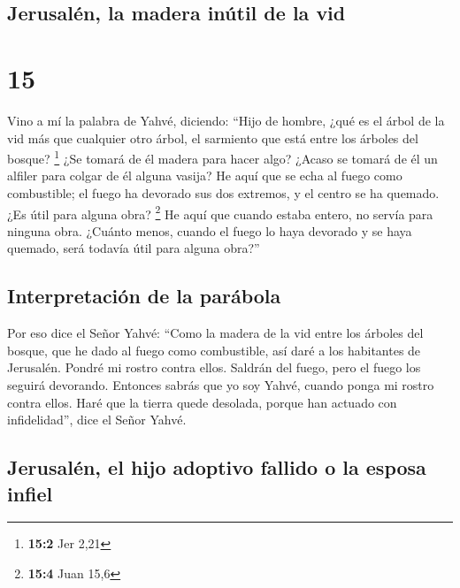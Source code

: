 \hypertarget{jerusaluxe9n-la-madera-inuxfatil-de-la-vid}{%
\subsection{Jerusalén, la madera inútil de la
vid}\label{jerusaluxe9n-la-madera-inuxfatil-de-la-vid}}

\hypertarget{section-14}{%
\section{15}\label{section-14}}

 Vino a mí la palabra de Yahvé, diciendo: 
``Hijo de hombre, ¿qué es el árbol de la vid más que cualquier otro
árbol, el sarmiento que está entre los árboles del bosque? \footnote{\textbf{15:2}
  Jer 2,21}  ¿Se tomará de él madera para hacer algo?
¿Acaso se tomará de él un alfiler para colgar de él alguna vasija?
 He aquí que se echa al fuego como combustible; el fuego
ha devorado sus dos extremos, y el centro se ha quemado. ¿Es útil para
alguna obra? \footnote{\textbf{15:4} Juan 15,6}  He aquí
que cuando estaba entero, no servía para ninguna obra. ¿Cuánto menos,
cuando el fuego lo haya devorado y se haya quemado, será todavía útil
para alguna obra?''

\hypertarget{interpretaciuxf3n-de-la-paruxe1bola}{%
\subsection{Interpretación de la
parábola}\label{interpretaciuxf3n-de-la-paruxe1bola}}

 Por eso dice el Señor Yahvé: ``Como la madera de la vid
entre los árboles del bosque, que he dado al fuego como combustible, así
daré a los habitantes de Jerusalén.  Pondré mi rostro
contra ellos. Saldrán del fuego, pero el fuego los seguirá devorando.
Entonces sabrás que yo soy Yahvé, cuando ponga mi rostro contra ellos.
 Haré que la tierra quede desolada, porque han actuado con
infidelidad'', dice el Señor Yahvé.

\hypertarget{jerusaluxe9n-el-hijo-adoptivo-fallido-o-la-esposa-infiel}{%
\subsection{Jerusalén, el hijo adoptivo fallido o la esposa
infiel}\label{jerusaluxe9n-el-hijo-adoptivo-fallido-o-la-esposa-infiel}}

